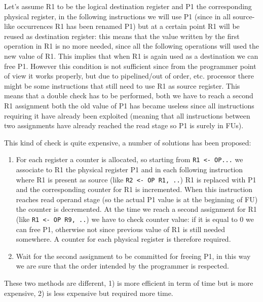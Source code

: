 Let's assume R1 to be the logical destination register and P1 the corresponding physical register, in the following instructions we will use P1 (since in all source-like occurrences R1 has been renamed P1) but at a certain point R1 will be reused as destination register: this means that the value written by the first operation in R1 is no more needed, since all the following operations will used the new value of R1. This implies that when R1 is again used as a destination we can free P1.
However this condition is not sufficient since from the programmer point of view it works properly, but due to pipelined/out of order, etc. processor there might be some instructions that still need to use R1 as source register. This means that a double check has to be performed, both we have to reach a second R1 assignment both the old value of P1 has became useless since all instructions requiring it have already been exploited (meaning that all instructions between two assignments have already reached the read stage so P1 is surely in FUs).

This kind of check is quite expensive, a number of solutions has been proposed:

\begin{enumerate}
  \item For each register a counter is allocated, so starting from \verb|R1 <- OP...| we associate to R1 the physical register P1 and in each following instruction where R1 is present as source (like \verb|R2 <- OP R1, ..|) R1 is replaced with P1 and the corresponding counter for R1 is incremented. When this instruction reaches read operand stage (so the actual P1 value is at the beginning of FU) the counter is decremented. At the time we reach a second assignment for R1 (like \verb|R1 <- OP R9, ..|) we have to check counter value: if it is equal to 0 we can free P1, otherwise not since previous value of R1 is still needed somewhere. A counter for each physical register is therefore required.

  \item Wait for the second assignment to be committed for freeing P1, in this way we are sure that the order intended by the programmer is respected.

\end{enumerate}

These two methods are different, 1) is more efficient in term of time but is more expensive, 2) is less expensive but required more time.



